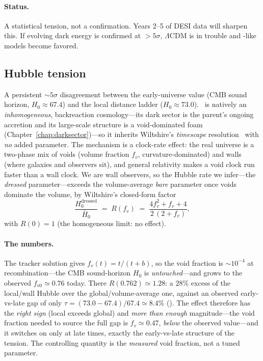 \paragraph{Status.} A statistical tension, not a confirmation. Years 2--5 of DESI
data will sharpen this. If evolving dark energy is confirmed at $>5\sigma$,
$\Lambda$CDM is in trouble and \SCT-like models become favored.

\subsection{Hubble tension}
\label{sec:hubble-tension}

A persistent $\sim 5\sigma$ disagreement between the early-universe value (CMB
sound horizon, $H_0\approx67.4$) and the local distance ladder
($H_0\approx73.0$). \SCT\ is natively an \emph{inhomogeneous}, backreaction
cosmology---its dark sector is the parent's ongoing accretion and its large-scale
structure is a void-dominated foam (Chapter~\ref{chap:darksector})---so it
inherits Wiltshire's \emph{timescape} resolution~\citep{wiltshire2007,
wiltshire2009} with \emph{no} added parameter. The mechanism is a clock-rate
effect: the real universe is a two-phase mix of voids (volume fraction $f_v$,
curvature-dominated) and walls (where galaxies and observers sit), and general
relativity makes a void clock run faster than a wall clock. We are wall observers,
so the Hubble rate we infer---the \emph{dressed} parameter---exceeds the
volume-average \emph{bare} parameter once voids dominate the volume, by Wiltshire's
closed-form factor
\begin{equation}
  \frac{H_0^{\mathrm{dressed}}}{\bar H_0}
   \;=\; R(f_v)\;=\;\frac{4f_v^2+f_v+4}{2\,(2+f_v)},
  \label{eq:dressed-bare}
\end{equation}
with $R(0)=1$ (the homogeneous limit: no effect).

\paragraph{The numbers.} The tracker solution gives $f_v(t)=t/(t+b)$, so the void
fraction is $\sim10^{-4}$ at recombination---the CMB sound-horizon $H_0$ is
\emph{untouched}---and grows to the observed $f_{v0}\simeq0.76$ today. There
$R(0.762)\simeq1.28$: a $28\%$ excess of the local/wall Hubble over the
global/volume-average one, against an observed early-vs-late gap of only
$\tau=(73.0-67.4)/67.4\simeq8.4\%$ (). The effect therefore has
the \emph{right sign} (local exceeds global) and \emph{more than enough}
magnitude---the void fraction needed to source the full gap is $f_v\simeq0.47$,
\emph{below} the observed value---and it switches on only at late times, exactly
the early-vs-late structure of the tension. The controlling quantity is the
\emph{measured} void fraction, not a tuned parameter.

